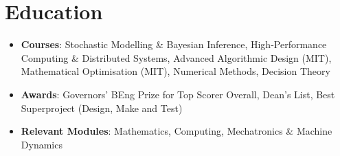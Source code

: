 \documentclass{cv}
\begin{document}
\section{Education}
\begin{subsections}
    \subtitle{SM Computational Science and Engineering
        -- GPA: 3.92 / 4.0
        \hfill Massachusetts, United States}
    \begin{itemize}[leftmargin=!, itemindent=-1em]
        \item \textbf{Courses}: Stochastic Modelling \& Bayesian Inference, High-Performance Computing \& Distributed Systems, Advanced Algorithmic Design (MIT), Mathematical Optimisation (MIT), Numerical Methods, Decision Theory
    \end{itemize}

    \subtitle{BEng Mechanical Engineering -- First Class Honours, 1$^{st}$ in cohort overall
        \hfill London, United Kingdom}
    \begin{itemize}[leftmargin=!, itemindent=-1em]
        \item \textbf{Awards}: Governors' BEng Prize for Top Scorer Overall, Dean's List, Best Superproject (Design, Make and Test)
        \item \textbf{Relevant Modules}: Mathematics, Computing, Mechatronics \& Machine Dynamics
    \end{itemize}
\end{subsections}
\end{document}
